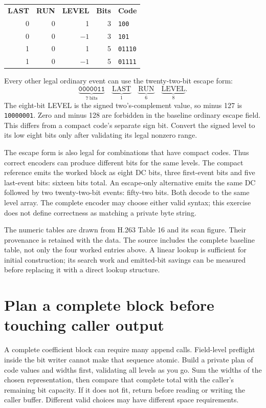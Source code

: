\begin{center}
  \begin{tabular}{rrrrl}
    \textbf{LAST} & \textbf{RUN} & \textbf{LEVEL} & \textbf{Bits} & \textbf{Code}  \\
    0             & 0            & 1              & 3             & \texttt{100}   \\
    0             & 0            & $-1$           & 3             & \texttt{101}   \\
    1             & 0            & 1              & 5             & \texttt{01110} \\
    1             & 0            & $-1$           & 5             & \texttt{01111}
  \end{tabular}
\end{center}
Every other legal ordinary event can use the twenty-two-bit escape form:
\[
  \underbrace{\texttt{0000011}}_{7\ \mathrm{bits}}\quad
  \underbrace{\mathrm{LAST}}_{1}\quad
  \underbrace{\mathrm{RUN}}_{6}\quad
  \underbrace{\mathrm{LEVEL}}_{8}.
\]
The eight-bit LEVEL is the signed two's-complement value, so minus 127 is
\texttt{10000001}. Zero and minus 128 are forbidden in the baseline ordinary
escape field. This differs from a compact code's separate sign bit. Convert the
signed level to its low eight bits only after validating its legal nonzero range.

The escape form is also legal for combinations that have compact codes. Thus
correct encoders can produce different bits for the same levels. The compact
reference emits the worked block as eight DC bits, three first-event bits and
five last-event bits: sixteen bits total. An escape-only alternative emits the
same DC followed by two twenty-two-bit events: fifty-two bits. Both decode to
the same level array. The complete encoder may choose either valid syntax;
this exercise does not define correctness as matching a private byte string.

The numeric tables are drawn from H.263 Table 16 and its scan figure. Their
provenance is retained with the data. The source includes the complete baseline
table, not only the four worked entries above. A linear lookup is sufficient for
initial construction; its search work and emitted-bit savings can be measured
before replacing it with a direct lookup structure.

\section{Plan a complete block before touching caller output}
A complete coefficient block can require many append calls. Field-level preflight
inside the bit writer cannot make that sequence atomic. Build a private plan of
code values and widths first, validating all levels as you go. Sum the widths of
the chosen representation, then compare that complete total with the caller's
remaining bit capacity. If it does not fit, return before reading or writing the
caller buffer. Different valid choices may have different space requirements.

